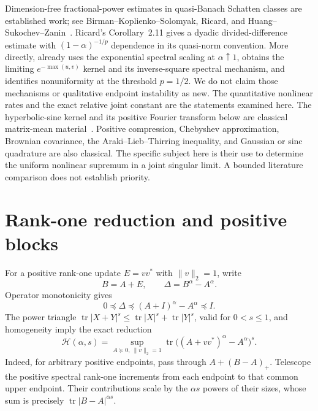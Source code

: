 \documentclass[11pt]{article}
\numberwithin{equation}{section}
\newcommand{\tr}{\operatorname{tr}}
\newcommand{\cH}{\mathcal H}
\begin{document}
Dimension-free fractional-power estimates in quasi-Banach Schatten
classes are established work; see Birman--Koplienko--Solomyak,
Ricard, and Huang--Sukochev--Zanin~\cite{BKS,Ricard,HSZ}.
Ricard's Corollary~2.11 gives a dyadic divided-difference estimate
with $(1-\alpha)^{-1/p}$ dependence in its quasi-norm convention.
More directly, \cite[Remark~5.3]{Ricard} already uses the exponential
spectral scaling at $\alpha\uparrow1$, obtains the limiting
$e^{-\max(u,v)}$ kernel and its inverse-square spectral mechanism,
and identifies nonuniformity at the threshold $p=1/2$.
We do not claim those mechanisms or qualitative endpoint instability
as new. The quantitative nonlinear rates and the exact relative
joint constant are the statements examined here.
The hyperbolic-sine kernel and its positive Fourier transform below
are classical matrix-mean material~\cite{HK,Bhatia}. Positive
compression, Chebyshev approximation, Brownian covariance, the
Araki--Lieb--Thirring inequality, and Gaussian or sinc quadrature are
also classical. The specific subject here is their use to determine
the uniform nonlinear supremum in a joint singular limit. A bounded
literature comparison does not establish priority.

\section{Rank-one reduction and positive blocks}

For a positive rank-one update $E=vv^*$ with $\|v\|_2=1$, write
\[
 B=A+E,\qquad \Delta=B^\alpha-A^\alpha.
\]
Operator monotonicity gives
\begin{equation}\label{eq:contractive}
 0\preceq\Delta\preceq (A+I)^\alpha-A^\alpha\preceq I.
\end{equation}
The power triangle $\tr|X+Y|^s\le\tr|X|^s+\tr|Y|^s$, valid for
$0<s\le1$, and homogeneity imply the exact reduction
\begin{equation}\label{eq:rankone}
 \cH(\alpha,s)=\sup_{A\succeq0,\ \|v\|_2=1}
              \tr\big((A+vv^*)^\alpha-A^\alpha\big)^s.
\end{equation}
Indeed, for arbitrary positive endpoints, pass through
$A+(B-A)_+$. Telescope the positive spectral rank-one increments
from each endpoint to that common upper endpoint. Their contributions
scale by the $\alpha s$ powers of their sizes, whose sum is precisely
$\tr|B-A|^{\alpha s}$.
\end{document}
